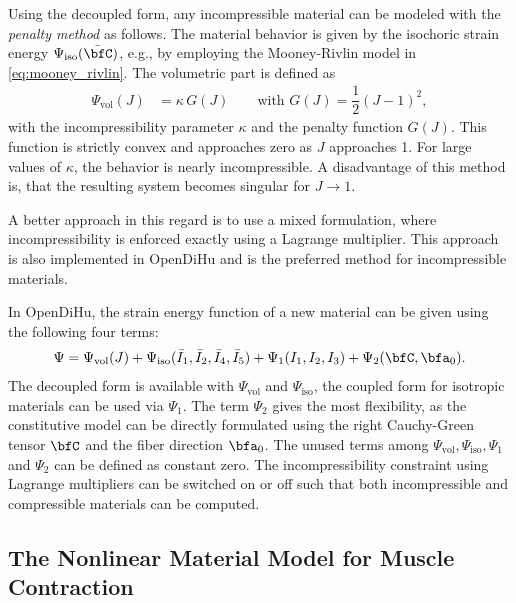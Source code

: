 Using the decoupled form, any incompressible material can be modeled with the \emph{penalty method} as follows. 
The material behavior is given by the isochoric strain energy $\Psi_\text{iso}(\bar{\bfC})$, e.g., by employing the Mooney-Rivlin model in \cref{eq:mooney_rivlin}. The volumetric part is defined as
\begin{align*}
  \Psi_\text{vol}(J) &= \kappa\,G(J) \qquad \text{with } G(J) = \dfrac12 (J-1)^2,
\end{align*}
with the incompressibility parameter $\kappa$ and the penalty function $G(J)$. This function is strictly convex and approaches zero as $J$ approaches 1. For large values of $\kappa$, the behavior is nearly incompressible. A disadvantage of this method is, that the resulting system becomes singular for $J \to 1$.

A better approach in this regard is to use a mixed formulation, where incompressibility is enforced exactly using a Lagrange multiplier. This approach is also implemented in OpenDiHu and is the preferred method for incompressible materials. 

In OpenDiHu, the strain energy function of a new material can be given using the following four terms:
%
\begin{align}\label{eq:definition_psi}
  \Psi = \Psi_\text{vol}(J) + \Psi_\text{iso}(\bar{I}_1,\bar{I}_2,\bar{I}_4,\bar{I}_5) + \Psi_1(I_1,I_2,I_3) + \Psi_2(\bfC,\bfa_0).
\end{align}
The decoupled form is available with $\Psi_\text{vol}$ and $\Psi_\text{iso}$, the coupled form for isotropic materials can be used via $\Psi_1$. The term $\Psi_2$ gives the most flexibility, as the constitutive model can be directly formulated using the right Cauchy-Green tensor $\bfC$ and the fiber direction $\bfa_0$. The unused terms among $\Psi_\text{vol},\Psi_\text{iso},\Psi_1$ and $\Psi_2$ can be defined as constant zero. The incompressibility constraint using Lagrange multipliers can be switched on or off such that both incompressible and compressible materials can be computed.
%

\subsection{The Nonlinear Material Model for Muscle Contraction}\label{sec:material_nonlinear_model}


